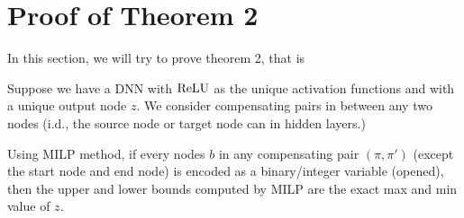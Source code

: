 				
				
				\section{Proof of Theorem 2}
				
				In this section, we will try to prove theorem 2, that is 
				
				\begin{theorem}
					\label{no_diamond_3}
					
					Suppose we have a DNN with $\mathrm{ReLU}$ as the unique activation functions and with a unique output node $z$. We consider compensating pairs in between any two nodes (i.d., the source node or target node can in hidden layers.)
					
					Using MILP method, if every nodes $b$ in any compensating pair
					$(\pi,\pi')$ (except the start node and end node) is encoded as a binary/integer variable (opened), then the upper and lower 
					bounds computed by MILP are the exact max and min value of $z$.
				\end{theorem}
				
